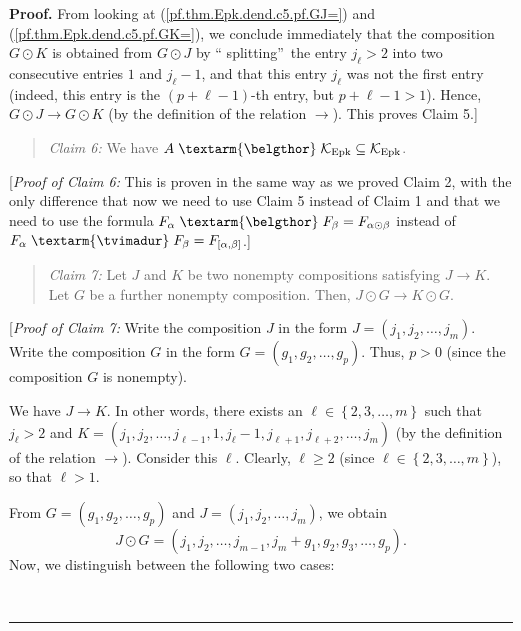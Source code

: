 \documentclass[numbers=enddot,12pt,final,onecolumn,notitlepage]{scrartcl}%
\theoremstyle{definition}
\newenvironment{statement}{\begin{quote}}{\end{quote}}
\newenvironment{proof}[1][Proof]{\noindent\textbf{#1.} }{\ \rule{0.5em}{0.5em}}
\newenvironment{verlong}{}{}
\newcommand{\tvi}{\left. \textarm{\tvimadur} \right.}
\newcommand{\bel}{\left. \textarm{\belgthor} \right.}
\begin{document}
\begin{verlong}
\begin{proof}
From looking at (\ref{pf.thm.Epk.dend.c5.pf.GJ=}) and
(\ref{pf.thm.Epk.dend.c5.pf.GK=}), we conclude immediately that the
composition $G\odot K$ is obtained from $G\odot J$ by \textquotedblleft
splitting\textquotedblright\ the entry $j_{\ell}>2$ into two consecutive
entries $1$ and $j_{\ell}-1$, and that this entry $j_{\ell}$ was not the first
entry (indeed, this entry is the $\left(  p+\ell-1\right)  $-th entry, but
$p+\ell-1>1$). Hence, $G\odot J\rightarrow G\odot K$ (by the definition of the
relation $\rightarrow$). This proves Claim 5.]

\begin{statement}
\textit{Claim 6:} We have $A\bel\mathcal{K}_{\operatorname{Epk}}%
\subseteq\mathcal{K}_{\operatorname{Epk}}$.
\end{statement}

[\textit{Proof of Claim 6:} This is proven in the same way as we proved Claim
2, with the only difference that now we need to use Claim 5 instead of Claim 1
and that we need to use the formula $F_{\alpha}\bel  F_{\beta}=F_{\alpha
\odot\beta}$ instead of $F_{\alpha}\tvi  F_{\beta}=F_{\left[  \alpha
,\beta\right]  }$.]

\begin{statement}
\textit{Claim 7:} Let $J$ and $K$ be two nonempty compositions satisfying
$J\rightarrow K$. Let $G$ be a further nonempty composition. Then, $J\odot
G\rightarrow K\odot G$.
\end{statement}

[\textit{Proof of Claim 7:} Write the composition $J$ in the form $J=\left(
j_{1},j_{2},\ldots,j_{m}\right)  $. Write the composition $G$ in the form
$G=\left(  g_{1},g_{2},\ldots,g_{p}\right)  $. Thus, $p>0$ (since the
composition $G$ is nonempty).

We have $J\rightarrow K$. In other words, there exists an $\ell\in\left\{
2,3,\ldots,m\right\}  $ such that $j_{\ell}>2$ and $K=\left(  j_{1}%
,j_{2},\ldots,j_{\ell-1},1,j_{\ell}-1,j_{\ell+1},j_{\ell+2},\ldots
,j_{m}\right)  $ (by the definition of the relation $\rightarrow$). Consider
this $\ell$. Clearly, $\ell\geq2$ (since $\ell\in\left\{  2,3,\ldots
,m\right\}  $), so that $\ell>1$.

From $G=\left(  g_{1},g_{2},\ldots,g_{p}\right)  $ and $J=\left(  j_{1}%
,j_{2},\ldots,j_{m}\right)  $, we obtain%
\begin{equation}
J\odot G=\left(  j_{1},j_{2},\ldots,j_{m-1},j_{m}+g_{1},g_{2},g_{3}%
,\ldots,g_{p}\right)  . \label{pf.thm.Epk.dend.c7.pf.JG=}%
\end{equation}
Now, we distinguish between the following two cases:


\end{proof}
\end{verlong}
\end{document}
